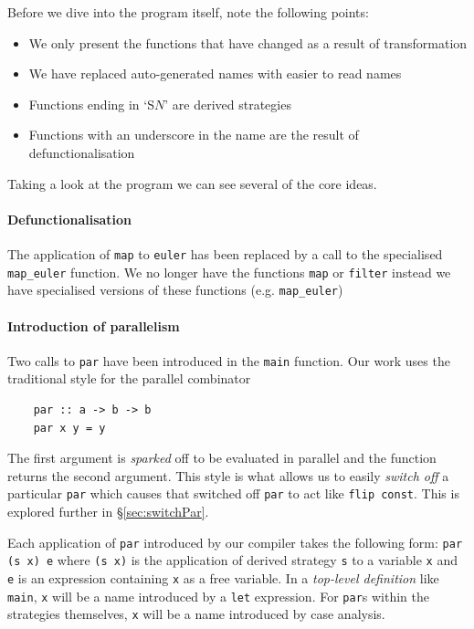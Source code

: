 Before we dive into the program itself, note the following points:

\begin{itemize}
    \item We only present the functions that have changed as a result of transformation
    \item We have replaced auto-generated names with easier to read names
    \item Functions ending in `S$N$' are derived strategies
    \item Functions with an underscore in the name are the result of defunctionalisation
\end{itemize}

Taking a look at the program we can see several of the core ideas.

\paragraph{Defunctionalisation}
The application of \verb-map- to \verb-euler- has been replaced by a call to
the specialised \verb-map_euler- function.  We no longer have the functions
\verb-map- or \verb-filter- instead we have specialised versions of these
functions (e.g. \verb-map_euler-)

\paragraph{Introduction of parallelism}
Two calls to \verb-par- have been introduced in the \texttt{main} function. Our
work uses the traditional style for the parallel combinator \citep{strategies}

\begin{verbatim}
    par :: a -> b -> b
    par x y = y
\end{verbatim}

The first argument is \emph{sparked} off to be evaluated in parallel and the
function returns the second argument. This style is what allows us to easily
\emph{switch off} a particular \verb-par- which causes that switched off
\verb-par- to act like \verb-flip const-. This is explored further in
\S\ref{sec:switchPar}.

Each application of \verb-par- introduced by our compiler takes the following
form: \verb-par (s x) e- where \verb-(s x)- is the application of derived
strategy \verb-s- to a variable \verb$x$ and \verb$e$ is an expression containing \verb$x$ as a
free variable.  In a \emph{top-level definition} like \verb-main-, \verb$x$ will be a
name introduced by a \verb-let- expression. For \verb-par-s within the
strategies themselves, \verb$x$ will be a name introduced by case analysis.

